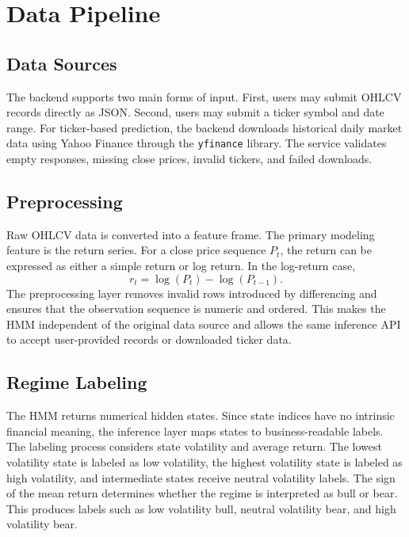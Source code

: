 \documentclass[conference]{IEEEtran}
\begin{document}
\section{Data Pipeline}
\subsection{Data Sources}
The backend supports two main forms of input. First, users may submit OHLCV records directly as JSON. Second, users may submit a ticker symbol and date range. For ticker-based prediction, the backend downloads historical daily market data using Yahoo Finance through the \texttt{yfinance} library. The service validates empty responses, missing close prices, invalid tickers, and failed downloads.

\subsection{Preprocessing}
Raw OHLCV data is converted into a feature frame. The primary modeling feature is the return series. For a close price sequence $P_t$, the return can be expressed as either a simple return or log return. In the log-return case,
\begin{equation}
    r_t=\log(P_t)-\log(P_{t-1}).
\end{equation}
The preprocessing layer removes invalid rows introduced by differencing and ensures that the observation sequence is numeric and ordered. This makes the HMM independent of the original data source and allows the same inference API to accept user-provided records or downloaded ticker data.

\subsection{Regime Labeling}
The HMM returns numerical hidden states. Since state indices have no intrinsic financial meaning, the inference layer maps states to business-readable labels. The labeling process considers state volatility and average return. The lowest volatility state is labeled as low volatility, the highest volatility state is labeled as high volatility, and intermediate states receive neutral volatility labels. The sign of the mean return determines whether the regime is interpreted as bull or bear. This produces labels such as low volatility bull, neutral volatility bear, and high volatility bear.
\end{document}
